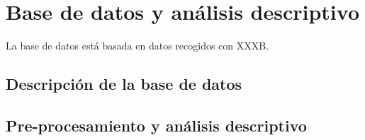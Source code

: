 \chapter{Base de datos y análisis descriptivo}
\label{CAP:Titulo3}

La base de datos está basada en datos recogidos con XXXB.

\section{Descripción de la base de datos}



\section{ Pre-procesamiento y análisis descriptivo}

